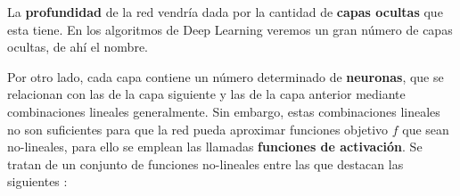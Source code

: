         \noindent La \textbf{profundidad} de la red vendría dada por la cantidad de \textbf{capas ocultas} que esta tiene. En los algoritmos de Deep Learning veremos un gran número de capas ocultas, de ahí el nombre. 

        \medskip

        \noindent Por otro lado, cada capa contiene un número determinado de \textbf{neuronas}, que se relacionan con las de la capa siguiente y las de la capa anterior mediante combinaciones lineales generalmente. Sin embargo, estas combinaciones lineales no son suficientes para que la red pueda aproximar funciones objetivo $f$ que sean no-lineales, para ello se emplean las llamadas \textbf{funciones de activación}. Se tratan de un conjunto de funciones no-lineales entre las que destacan las siguientes \cite{sharma2017activation}: 

